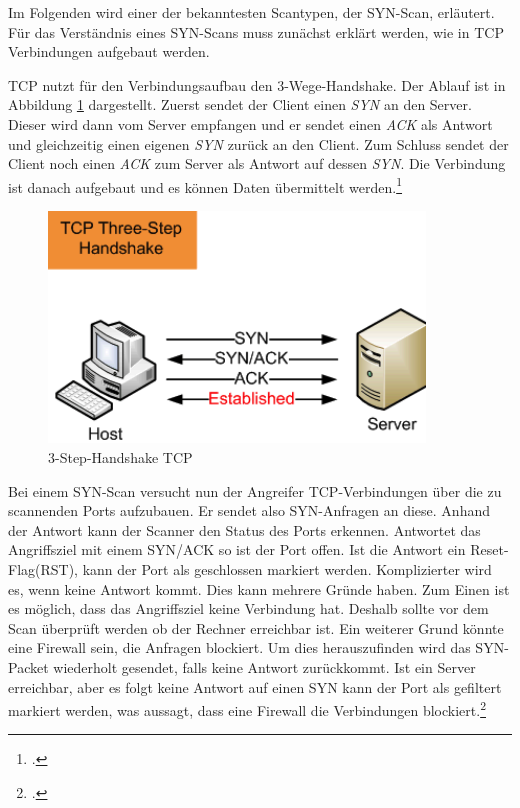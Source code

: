 Im Folgenden wird einer der bekanntesten Scantypen, der SYN-Scan, erläutert. Für das Verständnis
eines SYN-Scans muss zunächst erklärt werden, wie in TCP Verbindungen aufgebaut werden.

TCP nutzt für den Verbindungsaufbau den 3-Wege-Handshake. Der Ablauf ist in Abbildung
\ref{fig:handshake} dargestellt. Zuerst sendet der Client einen \textit{SYN} an den Server. Dieser
wird dann vom Server empfangen und er sendet einen \textit{ACK} als Antwort und gleichzeitig einen
eigenen \textit{SYN} zurück an den Client. Zum Schluss sendet der Client noch einen \textit{ACK}
zum Server als Antwort auf dessen \textit{SYN}. Die Verbindung ist danach aufgebaut und es können
Daten übermittelt werden.\footcite[Vgl.][32]{port2} \begin{figure}[H]
  \centering
  \includegraphics[width=10cm]{images/handshake}
  \caption[3-Step-Handshake TCP]{3-Step-Handshake TCP\protect\footnotemark}
  \label{fig:handshake}
\end{figure}

Bei einem SYN-Scan versucht nun der Angreifer TCP-Verbindungen über die zu scannenden Ports
aufzubauen. Er sendet also SYN-Anfragen an diese. Anhand der Antwort kann der Scanner den Status
des Ports erkennen. Antwortet das Angriffsziel mit einem SYN/ACK so ist der Port offen. Ist die
Antwort ein Reset-Flag(RST), kann der Port als geschlossen markiert werden. Komplizierter wird es,
wenn keine Antwort kommt. Dies kann mehrere Gründe haben. Zum Einen ist es möglich, dass das
Angriffsziel keine Verbindung hat. Deshalb sollte vor dem Scan überprüft werden ob der Rechner
erreichbar ist. Ein weiterer Grund könnte eine Firewall sein, die Anfragen blockiert. Um dies
herauszufinden wird das SYN-Packet wiederholt gesendet, falls keine Antwort zurückkommt. Ist ein
Server erreichbar, aber es folgt keine Antwort auf einen SYN kann der Port als gefiltert markiert
werden, was aussagt, dass eine Firewall die Verbindungen blockiert.\footcite[Vgl.][33]{port2}

